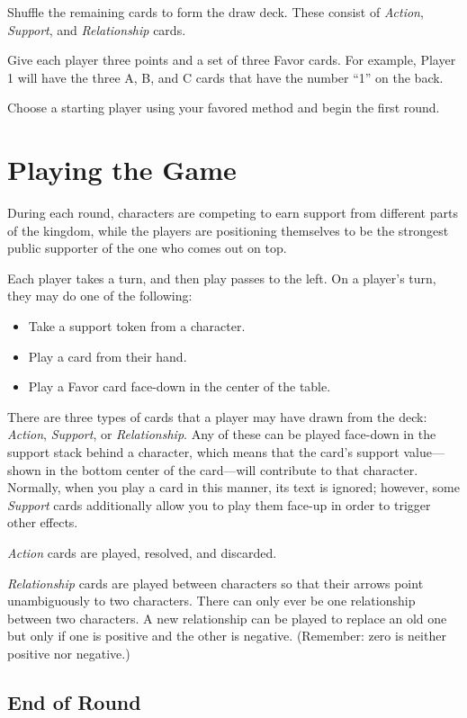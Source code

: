 \documentclass{article}
\begin{document}
Shuffle the remaining cards to form the draw deck. These consist of
\textit{Action}, \textit{Support}, and \textit{Relationship} cards.

Give each player three points and a set of three Favor cards. For example,
Player 1 will have the three A, B, and C cards that have the number ``1''
on the back.

Choose a starting player using your favored method and begin the first round.

\section*{Playing the Game}

During each round, characters are competing to earn support from
different parts of the kingdom, while the players are positioning
themselves to be the strongest public supporter of the one who comes
out on top.

Each player takes a turn, and then play passes to the left.
On a player's turn, they may do one of the following:
\begin{itemize}
\item Take a support token from a character. 
\item Play a card from their hand.
\item Play a Favor card face-down in the center of the table.
\end{itemize}

There are three types of cards that a player may have drawn from the
deck: \textit{Action}, \textit{Support}, or \textit{Relationship}.
Any of these can be played face-down in the support stack behind a
character, which means that the card's support value---shown in the
bottom center of the card---will contribute to that character.
Normally, when you play a card in this manner, its text is ignored;
however, some
\textit{Support} cards additionally allow you to play them face-up in
order to trigger other effects.

\textit{Action} cards are played, resolved, and discarded.

\textit{Relationship} cards are played between characters so that their
arrows point unambiguously to two characters. There can only ever
be one relationship between two characters. A new relationship can be
played to replace an old one but only if one is positive and the
other is negative. (Remember: zero is neither positive nor negative.)

\subsection*{End of Round}
\end{document}

